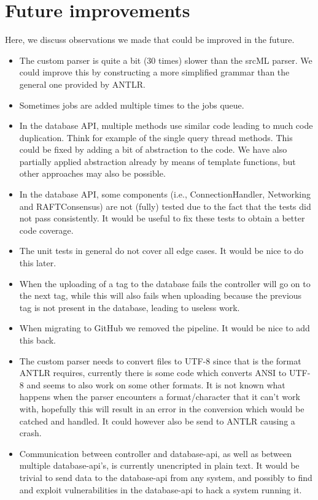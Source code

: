 \documentclass[./Main.tex]{subfiles}
\begin{document}
\section{Future improvements}
Here, we discuss observations we made that could be improved in the future.

\begin{itemize}
    \item The custom parser is quite a bit (30 times) slower than the srcML parser. We could improve this by constructing a more simplified grammar than the general one provided by ANTLR.
    \item Sometimes jobs are added multiple times to the jobs queue.
    \item In the database API, multiple methods use similar code leading to much code duplication. Think for example of the single query thread methods. This could be fixed by adding a bit of abstraction to the code. We have also partially applied abstraction already by means of template functions, but other approaches may also be possible.
    \item In the database API, some components (i.e., ConnectionHandler, Networking and RAFTConsensus) are not (fully) tested due to the fact that the tests did not pass consistently. It would be useful to fix these tests to obtain a better code coverage.
    \item The unit tests in general do not cover all edge cases. It would be nice to do this later.
    \item When the uploading of a tag to the database fails the controller will go on to the next tag, while this will also fails when uploading because the previous tag is not present in the database, leading to useless work.
    \item When migrating to GitHub we removed the pipeline. It would be nice to add this back.
    \item The custom parser needs to convert files to UTF-8 since that is the format ANTLR requires, currently there is some code which converts ANSI to UTF-8 and seems to also work on some other formats. It is not known what happens when the parser encounters a format/character that it can't work with, hopefully this will result in an error in the conversion which would be catched and handled. It could however also be send to ANTLR causing a crash.
    \item Communication between controller and database-api, as well as between multiple database-api's, is currently unencripted in plain text. It would be trivial to send data to the database-api from any system, and possibly to find and exploit vulnerabilities in the database-api to hack a system running it.

\end{itemize}
\end{document}
